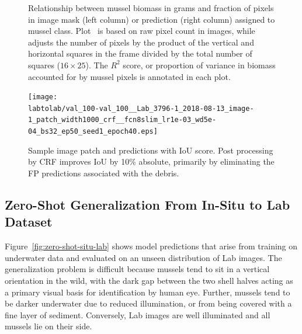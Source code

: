 \documentclass[11pt]{article} %
\begin{document}
\begin{figure}
\centering
{}
\caption{Relationship between mussel biomass in grams and fraction of pixels in 
image mask (left column) or prediction (right column) assigned to mussel class.
Plot~ is based on raw pixel count in images, 
while~ adjusts the number of pixels by the
product of the vertical and horizontal squares in the frame divided by the 
total number of squares ($16 \times 25$). The $R^2$ score, or proportion of
variance in biomass accounted for by mussel pixels is annotated in each plot.}
\label{fig:lab-to-lab-biomass-from-pixels}
\end{figure}

\begin{figure}
\centering
\texttt{[image: \\labtolab/val\_100-val\_100\_\_Lab\_3796-1\_2018-08-13\_image-1\_patch\_width1000\_crf\_\_fcn8slim\_lr1e-03\_wd5e-04\_bs32\_ep50\_seed1\_epoch40.eps]}
\caption{Sample image patch and predictions with IoU score. Post processing 
by CRF improves IoU by 10\% absolute, primarily by eliminating the FP
predictions associated with the debris.}
\label{fig:lab-to-lab-sample}
\end{figure}


\subsection{Zero-Shot Generalization From In-Situ to Lab Dataset}

Figure~\ref{fig:zero-shot-situ-lab} shows model predictions that arise from
training on underwater data and evaluated on an unseen distribution of Lab
images. The generalization problem is difficult because mussels tend to sit in a
vertical orientation in the wild, with the dark gap between the two shell
halves acting as a primary visual basis for identification by human eye. 
Further, mussels tend to be darker underwater due to reduced illumination, or
from being covered with a fine layer of sediment. Conversely, Lab images are 
well illuminated and all mussels lie on their side. 
\end{document}
